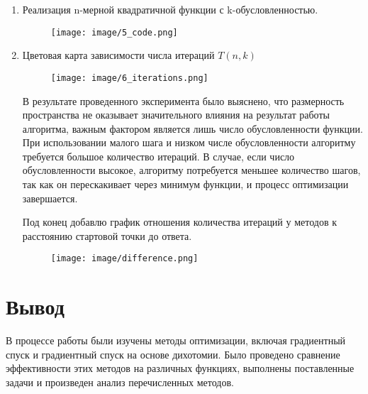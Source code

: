 \documentclass[12pt, a4paper]{article}
\begin{document}
\begin{enumerate}
\item Реализация n-мерной квадратичной функции с k-обусловленностью.

\begin{figure}[h]
\centering
\texttt{[image: image/5\_code.png]}
\end{figure}

\item Цветовая карта зависимости числа итераций $T(n,k)$

\begin{figure}[h]
\centering
\texttt{[image: image/6\_iterations.png]}
\end{figure}

В результате проведенного эксперимента было выяснено, что размерность пространства не оказывает значительного влияния на результат работы алгоритма, важным фактором является лишь число обусловленности функции. При использовании малого шага и низком числе обусловленности алгоритму требуется большое количество итераций. В случае, если число обусловленности высокое, алгоритму потребуется меньшее количество шагов, так как он перескакивает через минимум функции, и процесс оптимизации завершается.

Под конец добавлю график отношения количества итераций у методов к расстоянию стартовой точки до ответа.

\begin{figure}[h]
\centering
\texttt{[image: image/difference.png]}
\end{figure}

\end{enumerate}

\section{Вывод}
В процессе работы были изучены методы оптимизации, включая градиентный спуск и градиентный спуск на основе дихотомии. Было проведено сравнение эффективности этих методов на различных функциях, выполнены поставленные задачи и произведен анализ перечисленных методов.
\end{document}
